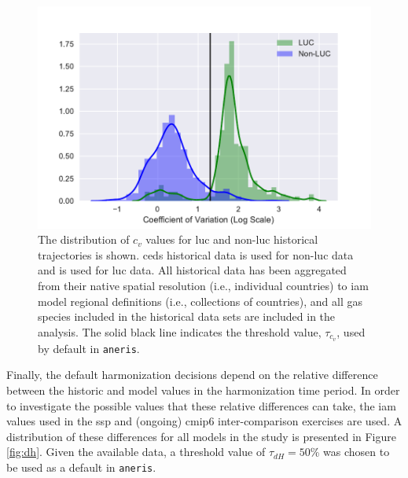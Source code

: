 \documentclass[review]{elsarticle}
\newcommand{\code}[1]{\lstinline[basicstyle=\ttfamily\color{black}]|#1|}
\begin{document}
\begin{figure}
  \begin{center}
    \includegraphics[width=\textwidth]{cov.pdf}
    \caption[]{
      \label{fig:cov}
      The distribution of $c_v$ values for \gls{luc} and non-\gls{luc} historical
      trajectories is shown. \gls{ceds} historical data \cite{hoesly_historical_2017}
      is used for non-\gls{luc} data and \cite{van_marle_historic_2017} is used for
      \gls{luc} data. All historical data has been aggregated from their native
      spatial resolution (i.e., individual countries) to \gls{iam} model regional
      definitions (i.e., collections of countries), and all gas species included
      in the historical data sets are included in the analysis. The solid black
      line indicates the threshold value, $\tau_{c_v}$, used by default in
      \code{aneris}.  }
  \end{center}
\end{figure}

Finally, the default harmonization decisions depend on the relative difference between
the historic and model values in the harmonization time period. In order to
investigate the possible values that these relative differences can take, the
\gls{iam} values used in the \gls{ssp} and (ongoing) \gls{cmip6} inter-comparison
exercises are used. A distribution of these differences for all models in the
study is presented in Figure \ref{fig:dh}. Given the available data, a threshold
value of $\tau_{dH} = 50$\% was chosen to be used as a default in \code{aneris}.
\end{document}
